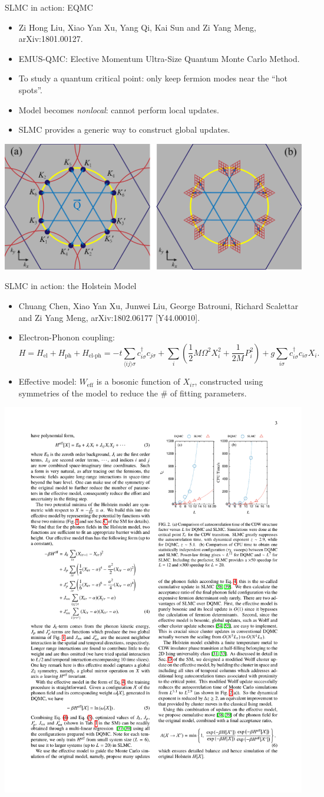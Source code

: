 \documentclass[xcolor=table, 10pt, aspectratio=169]{beamer}
\begin{document}
\begin{frame}{SLMC in action: EQMC}
\begin{itemize}
	\item Zi Hong Liu, Xiao Yan Xu, Yang Qi, Kai Sun and Zi Yang Meng, arXiv:1801.00127.
	\item EMUS-QMC: Elective Momentum Ultra-Size Quantum Monte Carlo Method.
	\item To study a quantum critical point: only keep fermion modes near the ``hot spots''.
	\item Model becomes \emph{nonlocal}: cannot perform local updates.
	\item SLMC provides a generic way to construct global updates.
\end{itemize}
\begin{center}
	\includegraphics[width=.8\textwidth]{../eqmc/kmeshtri}
\end{center}
\end{frame}

\begin{frame}{SLMC in action: the Holstein Model}
	\begin{itemize}
		\item Chuang Chen, Xiao Yan Xu, Junwei Liu, George Batrouni, Richard Scalettar and Zi Yang Meng, arXiv:1802.06177 [Y44.00010].
		\item Electron-Phonon coupling:
		\[H=H_{\text{el}}+H_{\text{ph}}+H_{\text{el-ph}}
		=-t\sum_{\langle ij\rangle\sigma}c_{i\sigma}^\dagger c_{j\sigma}
		+\sum_i\left(\frac12M\Omega^2X_i^2+\frac1{2M}P_i^2\right)
		+g\sum_{i\sigma}c_{i\sigma}^\dagger c_{i\sigma}X_i.\]
		\item Effective model: $W_{\text{eff}}$ is a bosonic function of $X_{i\tau}$, constructed using symmetries of the model to reduce the \# of fitting parameters.
	\end{itemize}
	\begin{center}
		\includegraphics[width=.35\textwidth]{holstein}
	\end{center}
\end{frame}
\end{document}
